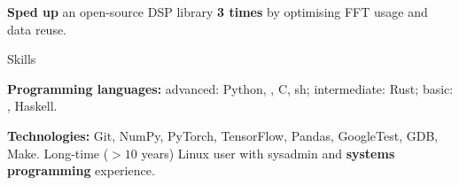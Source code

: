 \: {\bf Sped up} an open-source DSP library {\bf 3 times} by optimising FFT usage and data reuse.

\endlist





%
%


\sekce Skills
 
{\bf Programming languages:} {\af advanced:} {\B Python}, {\B \Cpp}, {\B C}, {\B sh}; {\af intermediate:} {\B Rust}; {\af basic:} \Cis{}, Haskell.

\smallskip

{\bf Technologies:} {\af Git}, {\af NumPy}, {\af PyTorch}, {\af TensorFlow},
{\af Pandas}, {\af GoogleTest}, {\af GDB}, {\af Make}. Long-time ($> 10$ years) Linux user
with sysadmin and {\bf systems programming} experience.

